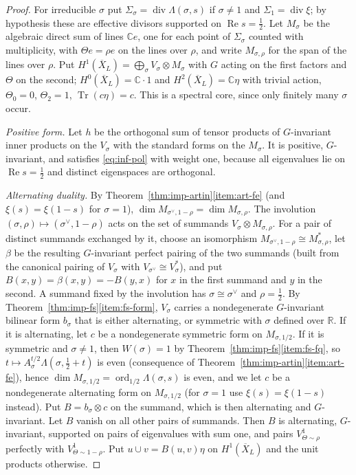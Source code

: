 \documentclass[11pt]{amsart}
\theoremstyle{plain}
\theoremstyle{definition}
\theoremstyle{remark}
\numberwithin{equation}{section}
\newcommand{\C}{\mathbb{C}}
\newcommand{\R}{\mathbb{R}}
\newcommand{\Xbar}{\overline{X}}
\DeclareMathOperator{\Tr}{Tr}
\DeclareMathOperator{\divisor}{div}
\DeclareMathOperator{\Rea}{Re}
\DeclareMathOperator{\ord}{ord}
\renewcommand{\Re}{\Rea}
\begin{document}
\begin{proof}
For irreducible $\sigma$ put $\Sigma_\sigma=\divisor\Lambda(\sigma,s)$
if $\sigma\ne1$ and $\Sigma_1=\divisor\xi$; by hypothesis these are
effective divisors supported on $\Re s=\tfrac12$. Let $M_\sigma$ be the
algebraic direct sum of lines $\C e$, one for each point of
$\Sigma_\sigma$ counted with multiplicity, with $\Theta e=\rho e$ on
the lines over $\rho$, and write $M_{\sigma,\rho}$ for the span of the
lines over $\rho$. Put $H^1(\Xbar_L)=\bigoplus_\sigma V_\sigma\otimes M_\sigma$
with $G$ acting on the first factors and $\Theta$ on the second;
$H^0(\Xbar_L)=\C\cdot1$ and $H^2(\Xbar_L)=\C\eta$ with trivial action,
$\Theta_0=0$, $\Theta_2=1$, $\Tr(c\eta)=c$. This is a spectral core,
since only finitely many $\sigma$ occur.

\emph{Positive form.} Let $h$ be the orthogonal sum of tensor products
of $G$-invariant inner products on the $V_\sigma$ with the standard
forms on the $M_\sigma$. It is positive, $G$-invariant, and satisfies
\eqref{eq:inf-pol} with weight one, because all eigenvalues lie on
$\Re s=\tfrac12$ and distinct eigenspaces are orthogonal.

\emph{Alternating duality.} By
Theorem~\ref{thm:imp-artin}\ref{item:art-fe} (and $\xi(s)=\xi(1-s)$ for
$\sigma=1$), $\dim M_{\sigma^\vee,1-\rho}=\dim M_{\sigma,\rho}$. The
involution $(\sigma,\rho)\mapsto(\sigma^\vee,1-\rho)$ acts on the set of
summands $V_\sigma\otimes M_{\sigma,\rho}$. For a pair of distinct
summands exchanged by it, choose an isomorphism
$M_{\sigma^\vee,1-\rho}\cong M_{\sigma,\rho}^*$, let $\beta$ be the
resulting $G$-invariant perfect pairing of the two summands (built from
the canonical pairing of $V_\sigma$ with $V_{\sigma^\vee}\cong
V_\sigma^*$), and put $B(x,y)=\beta(x,y)=-B(y,x)$ for $x$ in the first
summand and $y$ in the second. A summand fixed by the involution has
$\sigma\cong\sigma^\vee$ and $\rho=\tfrac12$. By
Theorem~\ref{thm:imp-fs}\ref{item:fs-form}, $V_\sigma$ carries a
nondegenerate $G$-invariant bilinear form $b_\sigma$ that is either
alternating, or symmetric with $\sigma$ defined over $\R$. If it is
alternating, let $c$ be a nondegenerate symmetric form on
$M_{\sigma,1/2}$. If it is symmetric and $\sigma\ne1$, then
$W(\sigma)=1$ by Theorem~\ref{thm:imp-fs}\ref{item:fs-fq}, so
$t\mapsto A_\sigma^{t/2}\Lambda(\sigma,\tfrac12+t)$ is even
(consequence of Theorem~\ref{thm:imp-artin}\ref{item:art-fe}), hence
$\dim M_{\sigma,1/2}=\ord_{1/2}\Lambda(\sigma,s)$ is even, and we let
$c$ be a nondegenerate alternating form on $M_{\sigma,1/2}$ (for
$\sigma=1$ use $\xi(s)=\xi(1-s)$ instead). Put $B=b_\sigma\otimes
c$ on the summand, which is then alternating and $G$-invariant. Let $B$
vanish on all other pairs of summands. Then $B$ is alternating,
$G$-invariant, supported on pairs of eigenvalues with sum one, and
pairs $V^1_{\Theta\sim\rho}$ perfectly with $V^1_{\Theta\sim1-\rho}$.
Put $u\cup v=B(u,v)\eta$ on $H^1(\Xbar_L)$ and the unit products otherwise.


\end{proof}
\end{document}
